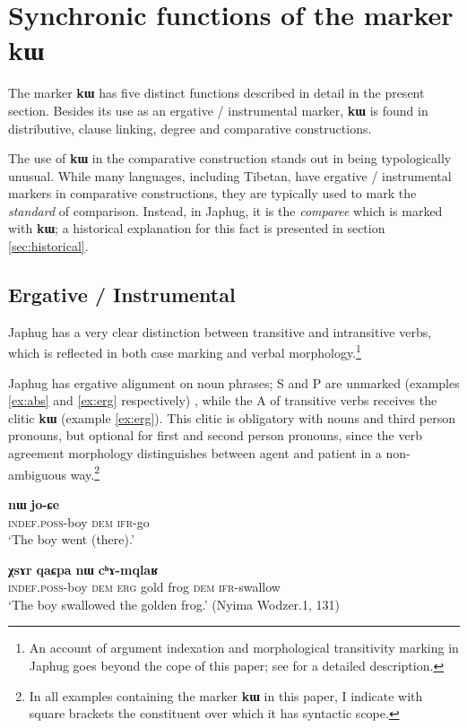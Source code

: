 \documentclass[oldfontcommands,oneside,a4paper,11pt]{article}
\newcommand{\ipa}[1]{{\phon\textbf{#1}}}
\begin{document}
\section{Synchronic functions of the marker \ipa{kɯ}} \label{sec:synchronic}
The marker \ipa{kɯ} has five distinct functions described in detail in the present section. Besides its use as an ergative / instrumental marker, \ipa{kɯ} is found in distributive, clause linking, degree and comparative constructions. 

The use of \ipa{kɯ} in the comparative construction stands out in being typologically unusual.  While many languages, including Tibetan, have ergative / instrumental markers in comparative constructions, they are typically used to mark the \textit{standard} of comparison. Instead, in Japhug,  it is the \textit{comparee} which is marked with \ipa{kɯ}; a historical explanation for this fact is presented in section \ref{sec:historical}.

\subsection{Ergative / Instrumental}
Japhug has a very clear   distinction between transitive and intransitive verbs, which is reflected in both case marking and verbal morphology.\footnote{An account of argument indexation and morphological transitivity marking in Japhug goes beyond the cope of this paper; see \citet{jacques10inverse} for a detailed description.}

Japhug has ergative alignment on noun phrases; S and P are unmarked (examples \ref{ex:abs} and \ref{ex:erg} respectively) , while the A of transitive verbs receives the clitic \ipa{kɯ} (example \ref{ex:erg}). This clitic is obligatory with nouns and third person pronouns, but optional for first and second person pronouns, since  the verb agreement morphology distinguishes between agent and patient in a non-ambiguous way.\footnote{In all examples containing the marker \ipa{kɯ} in this paper, I indicate with square brackets the constituent over which it has syntactic scope.}

\begin{exe}
\ex \label{ex:abs}
\gll \ipa{tɤ-tɕɯ}  	\ipa{nɯ}  	 	\ipa{jo-ɕe}   \\
\textsc{indef.poss}-boy \textsc{dem}   \textsc{ifr}-go \\
\glt `The boy went (there).'
\end{exe}

\begin{exe}
\ex \label{ex:erg}
\gll [\ipa{tɤ-tɕɯ}  	\ipa{nɯ}]  	\ipa{\textbf{kɯ}} 	\ipa{χsɤr}  	\ipa{qaɕpa}  	\ipa{nɯ}  	\ipa{cʰɤ-mqlaʁ}   \\
\textsc{indef.poss}-boy \textsc{dem} \textsc{erg} gold frog \textsc{dem} \textsc{ifr}-swallow \\
\glt `The boy swallowed the golden frog.' (Nyima Wodzer.1, 131)
\end{exe}
\end{document}
